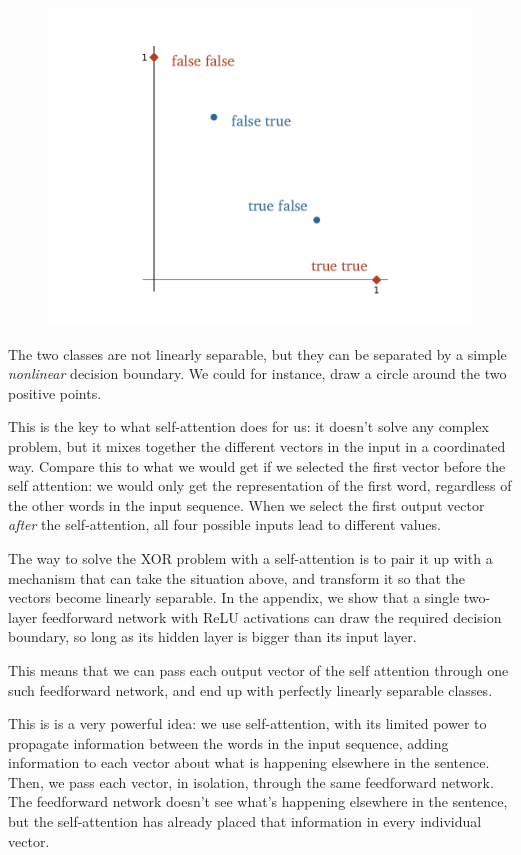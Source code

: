 \documentclass{pca}
\theoremstyle{theorem}
\theoremstyle{definition}
\theoremstyle{proof}
\begin{document}
\begin{figure}[H]
\centering
	\includegraphics[width=0.9\linewidth]{./images/attention/xor.pdf}
\end{figure}

The two classes are not linearly separable, but they can be separated by a simple \emph{nonlinear }decision boundary. We could for instance, draw a circle around the two positive points.

This is the key to what self-attention does for us: it doesn't solve any complex problem, but it mixes together the different vectors in the input in a coordinated way. Compare this to what we would get if we selected the first vector before the self attention: we would only get the  representation of the first word, regardless of the other words in the input sequence. When we select the first output vector \emph{after} the self-attention, all four possible inputs lead to different values.

The way to solve the XOR problem with a self-attention is to pair it up with a mechanism that can take the situation above, and transform it so that the vectors become linearly separable. In the appendix, we show that a single two-layer feedforward network with ReLU activations can draw the required decision boundary, so long as its hidden layer is bigger than its input layer.


This means that we can pass each output vector of the self attention through one such feedforward network, and end up with perfectly linearly separable classes. 

This is is a very powerful idea: we use self-attention, with its limited power to propagate information between the words in the input sequence, adding information to each vector about what is happening elsewhere in the sentence. Then, we pass each vector, in isolation, through the same feedforward network. The feedforward network doesn't see what's happening elsewhere in the sentence, but the self-attention has already placed that information in every individual vector. 
\end{document}
